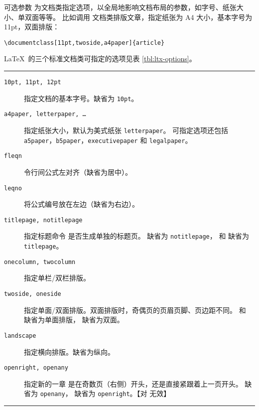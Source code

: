 可选参数  为文档类指定选项，以全局地影响文档布局的参数，如字号、纸张大小、单双面等等。
比如调用  文档类排版文章，指定纸张为 A4 大小，基本字号为 11pt，双面排版：
\begin{verbatim}
\documentclass[11pt,twoside,a4paper]{article}
\end{verbatim}

\LaTeX\ 的三个标准文档类可指定的选项见表 \ref{tbl:ltx-options}。

\begin{table}[htp]
\caption{\LaTeX\ 的三个标准文档类可指定的选项}\label{tbl:ltx-options}
\hrule
\begin{description}
\item[\texttt{10pt, 11pt, 12pt}] \quad 指定文档的基本字号。缺省为 \texttt{10pt}。

\item[\texttt{a4paper, letterpaper, \ldots}] \quad 指定纸张大小，默认为美式纸张 \texttt{letterpaper}。
可指定选项还包括 \texttt{a5paper}，\texttt{b5paper}，\texttt{executivepaper} 和 \texttt{legalpaper}。

\item[\texttt{fleqn}] \quad 令行间公式左对齐（缺省为居中）。

\item[\texttt{leqno}] \quad 将公式编号放在左边（缺省为右边）。

\item[\texttt{titlepage, notitlepage}] 指定标题命令  是否生成单独的标题页。
 缺省为 \texttt{notitlepage}， 和  缺省为 \texttt{titlepage}。

\item[\texttt{onecolumn, twocolumn}] \quad 指定单栏/双栏排版。

\item[\texttt{twoside, oneside}] \quad 指定单面/双面排版。双面排版时，奇偶页的页眉页脚、页边距不同。
 和  缺省为单面排版， 缺省为双面。

\item[\texttt{landscape}] \quad 指定横向排版。缺省为纵向。

\item[\texttt{openright, openany}] \quad 指定新的一章  是在奇数页（右侧）开头，还是直接紧跟着上一页开头。
 缺省为 \texttt{openany}， 缺省为 \texttt{openright}。【对  无效】
\end{description}
\hrule
\end{table}

